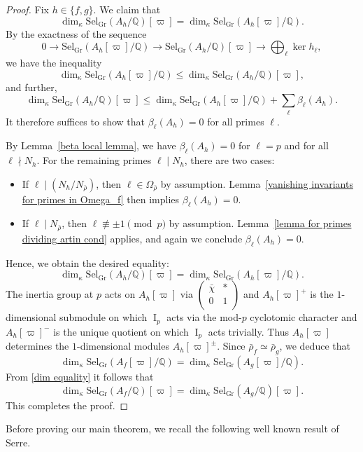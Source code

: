 \documentclass[table]{amsart}
\newcommand{\Q}{\mathbb{Q}}
\newcommand{\op}[1]{\operatorname{#1}}
\newcommand\mtx[4] { \left( {\begin{array}{cc}
 #1 & #2 \\
 #3 & #4 \\
 \end{array} } \right)}
\numberwithin{equation}{section}
\begin{document}
\begin{proof}
Fix $h \in \{f, g\}$. We claim that
\[
\dim_{\kappa} \mathrm{Sel}_{\mathrm{Gr}}(A_h/\Q)[\varpi] = \dim_{\kappa} \mathrm{Sel}_{\mathrm{Gr}}(A_h[\varpi]/\Q).
\]
\noindent By the exactness of the sequence
\begin{equation}\label{boring exact sequence}
0 \to \mathrm{Sel}_{\mathrm{Gr}}(A_h[\varpi]/\Q) \to \mathrm{Sel}_{\mathrm{Gr}}(A_h/\Q)[\varpi] \to \bigoplus_\ell \op{ker}h_\ell,
\end{equation}
we have the inequality
\[
\dim_{\kappa} \mathrm{Sel}_{\mathrm{Gr}}(A_h[\varpi]/\Q) \leq \dim_{\kappa} \mathrm{Sel}_{\mathrm{Gr}}(A_h/\Q)[\varpi],
\]
and further,
\[
\dim_{\kappa} \mathrm{Sel}_{\mathrm{Gr}}(A_h/\Q)[\varpi] \leq \dim_{\kappa} \mathrm{Sel}_{\mathrm{Gr}}(A_h[\varpi]/\Q) + \sum_\ell \beta_\ell(A_h).
\]
It therefore suffices to show that $\beta_\ell(A_h) = 0$ for all primes $\ell$.

By Lemma~\ref{beta local lemma}, we have $\beta_\ell(A_h) = 0$ for $\ell = p$ and for all $\ell \nmid N_h$. For the remaining primes $\ell \mid N_h$, there are two cases:

\begin{itemize}
    \item If $\ell \mid (N_h/N_{\bar{\rho}})$, then $\ell \in \Omega_{\bar{\rho}}$ by assumption. Lemma~\ref{vanishing invariants for primes in Omega_f} then implies $\beta_\ell(A_h) = 0$.
    
    \item If $\ell \mid N_{\bar{\rho}}$, then $\ell \not\equiv \pm 1 \pmod{p}$ by assumption. Lemma~\ref{lemma for primes dividing artin cond} applies, and again we conclude $\beta_\ell(A_h) = 0$.
\end{itemize}

Hence, we obtain the desired equality:
\begin{equation}\label{dim equality}\dim_{\kappa} \mathrm{Sel}_{\mathrm{Gr}}(A_h/\Q)[\varpi] = \dim_{\kappa} \mathrm{Sel}_{\mathrm{Gr}}(A_h[\varpi]/\Q).
\end{equation}
The inertia group at $p$ acts on $A_h[\varpi]$ via $\mtx{\bar{\chi}}{\ast}{0}{1}$ and $A_h[\varpi]^+$ is the $1$-dimensional submodule on which $\op{I}_p$ acts via the mod-$p$ cyclotomic character and $A_h[\varpi]^-$ is the unique quotient on which $\op{I}_p$ acts trivially. Thus $A_h[\varpi]$ determines the $1$-dimensional modules $A_h[\varpi]^\pm$. 
Since $\bar{\rho}_f \simeq \bar{\rho}_g$, we deduce that
\[\dim_{\kappa} \mathrm{Sel}_{\mathrm{Gr}}(A_f[\varpi]/\Q)=\dim_{\kappa} \mathrm{Sel}_{\mathrm{Gr}}(A_g[\varpi]/\Q).\]
From \eqref{dim equality} it follows that 
\[\dim_{\kappa} \mathrm{Sel}_{\mathrm{Gr}}(A_f/\Q)[\varpi]=\dim_{\kappa} \mathrm{Sel}_{\mathrm{Gr}}(A_g/\Q)[\varpi].\]
\noindent This completes the proof.
\end{proof} Before proving our main theorem, we recall the following well known result of Serre.
\end{document}
